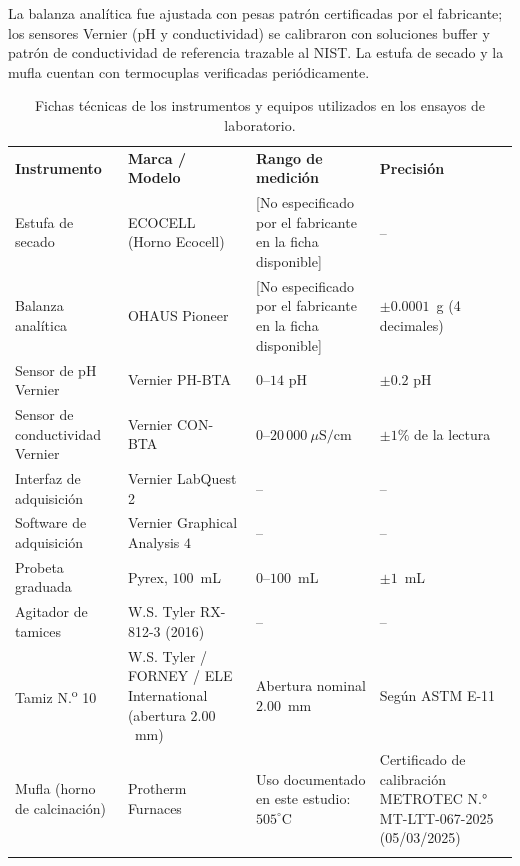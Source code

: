 \documentclass[fleqn]{jaes}
\begin{document}
La balanza analítica fue ajustada con pesas patrón certificadas por el fabricante; los sensores Vernier (pH y conductividad) se calibraron con soluciones buffer y patrón de conductividad de referencia trazable al NIST. La estufa de secado y la mufla cuentan con termocuplas verificadas periódicamente.

\begin{table}[!htb]
\centering
\small
\caption{Fichas técnicas de los instrumentos y equipos utilizados en los ensayos de laboratorio.}\label{tab:fichas_equipos}
\begin{tabular}{@{}p{4.0cm}p{4.1cm}p{4.1cm}p{4.0cm}@{}}
\toprule
\textbf{Instrumento} & \textbf{Marca / Modelo} & \textbf{Rango de medición} & \textbf{Precisión} \\
\colrule
Estufa de secado &
ECOCELL (Horno Ecocell) &
[No especificado por el fabricante en la ficha disponible] &
-- \\
Balanza analítica &
OHAUS Pioneer &
[No especificado por el fabricante en la ficha disponible] &
$\pm 0.0001$~g (4 decimales) \\
Sensor de pH Vernier &
Vernier PH-BTA &
$0$--$14$ pH &
$\pm 0.2$ pH \\
Sensor de conductividad Vernier &
Vernier CON-BTA &
$0$--$20\,000~\mu\text{S/cm}$ &
$\pm 1\%$ de la lectura \\
Interfaz de adquisición &
Vernier LabQuest 2 &
-- &
-- \\
Software de adquisición &
Vernier Graphical Analysis $4$ &
-- &
-- \\
Probeta graduada &
Pyrex, $100$~mL &
$0$--$100$~mL &
$\pm 1$~mL \\
Agitador de tamices &
W.S. Tyler RX-812-3 (2016) &
-- &
-- \\
Tamiz N.\textsuperscript{o} 10 &
W.S. Tyler / FORNEY / ELE International (abertura $2.00$~mm) &
Abertura nominal $2.00$~mm &
Según ASTM E-11 \\
Mufla (horno de calcinación) &
Protherm Furnaces &
Uso documentado en este estudio: $505^\circ\text{C}$ &
Certificado de calibración METROTEC N.° MT-LTT-067-2025 (05/03/2025) \\
\botrule
\end{tabular}
\end{table}
\end{document}
